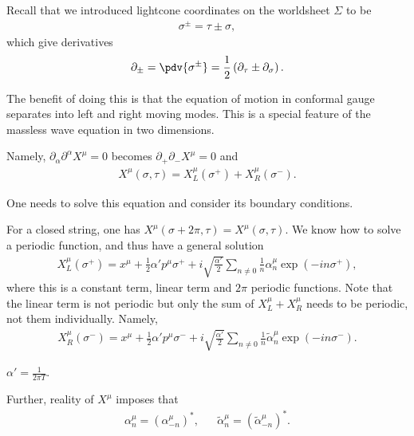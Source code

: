 
Recall that we introduced lightcone coordinates on the worldsheet $\Sigma$ to be
\begin{align}
    \sigma^{\pm} = \tau \pm \sigma
,\end{align}
which give derivatives
\begin{align}
    \partial_{\pm} = \pdv{\sigma^{\pm}} = \frac{1}{2} \left( \partial_\tau \pm \partial_\sigma \right) 
.\end{align}

The benefit of doing this is that the equation of motion in conformal gauge separates into left and right moving modes. This is a special feature of the massless wave equation in two dimensions.

Namely, $\partial_\alpha \partial^{\alpha} X^{\mu} = 0$ becomes $\partial_+ \partial_- X^{\mu} = 0$ and 
\begin{align}
    X^{\mu}\left( \sigma, \tau \right)  = X_L^{\mu}\left( \sigma^{+} \right)  + X^{\mu}_R \left( \sigma^{-} \right) 
.\end{align}

One needs to solve this equation and consider its boundary conditions.

For a closed string, one has $X^{\mu}\left( \sigma + 2\pi, \tau \right) = X^{\mu}\left( \sigma, \tau \right)$. We know how to solve a periodic function, and thus have a general solution
\begin{align}
    X^{\mu}_L \left( \sigma^{+} \right) = x^{\mu} + \frac{1}{2} \alpha' p^{\mu} \sigma^{+} + i\sqrt{\frac{\alpha'}{2}} \sum_{n\neq 0}^{} \frac{1}{n} \alpha^{\mu}_n \exp \left( -i n \sigma^{+} \right) 
,\end{align}
where this is a constant term, linear term and $2\pi$ periodic functions. Note that the linear term is not periodic but only the sum of $X_L^{\mu} + X_R^{\mu}$ needs to be periodic, not them individually. Namely,
\begin{align}
    X_R^{\mu} \left( \sigma^{-} \right) = x^{\mu} + \frac{1}{2} \alpha' p^{\mu} \sigma^{-} + i \sqrt{\frac{\alpha'}{2}} \sum_{n\neq 0}^{} \frac{1}{n  }\widetilde{\alpha}_n^{\mu} \exp \left( -i n \sigma^{-} \right) 
.\end{align}

\begin{note}
    $\alpha' = \frac{1}{2\pi T}$.
\end{note}

Further, reality of $X^{\mu}$ imposes that
\begin{align}
    \alpha_n^{\mu} = \left( \alpha^{\mu}_{-n} \right)^{*}, &&  \widetilde{\alpha}_n^{\mu} = \left( \widetilde{\alpha}^{\mu}_{-n} \right)^{*} 
.\end{align}

